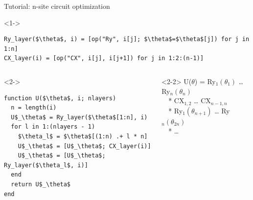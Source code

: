 \begin{frame}[fragile]{Tutorial: n-site circuit optimization}

\begin{onlyenv}<1->
\begin{lstlisting}[language=JuliaLocal, style=julia, mathescape, basicstyle=\small]
Ry_layer($\theta$, i) = [op("Ry", i[j]; $\theta$=$\theta$[j]) for j in 1:n]
CX_layer(i) = [op("CX", i[j], i[j+1]) for j in 1:2:(n-1)]
\end{lstlisting}
\end{onlyenv}

\begin{columns}

\begin{column}{5cm}

\begin{onlyenv}<2->
\begin{lstlisting}[language=JuliaLocal, style=julia, mathescape, basicstyle=\small]
function U($\theta$, i; nlayers)
  n = length(i)
  U$_\theta$ = Ry_layer($\theta$[1:n], i)
  for l in 1:(nlayers - 1)
    $\theta_l$ = $\theta$[(1:n) .+ l * n]
    U$_\theta$ = [U$_\theta$; CX_layer(i)]
    U$_\theta$ = [U$_\theta$; Ry_layer($\theta_l$, i)]
  end
  return U$_\theta$
end
\end{lstlisting}
\end{onlyenv}

\end{column}

\begin{column}{5.5cm}

\begin{onlyenv}<2-2>
U($\theta$) = Ry$_1(\theta_1)$ … Ry$_n(\theta_n)$ \\
\ \ *           CX$_{1,2}$ … CX$_{n-1,n}$ \\
\ \ *          Ry$_1(\theta_{n+1})$ … Ry$_n(\theta_{2n})$ \\
\ \ *           …
~\\
~\\
~\\
~\\
~\\
~\\
\end{onlyenv}


\end{column}
\end{columns}
\end{frame}
